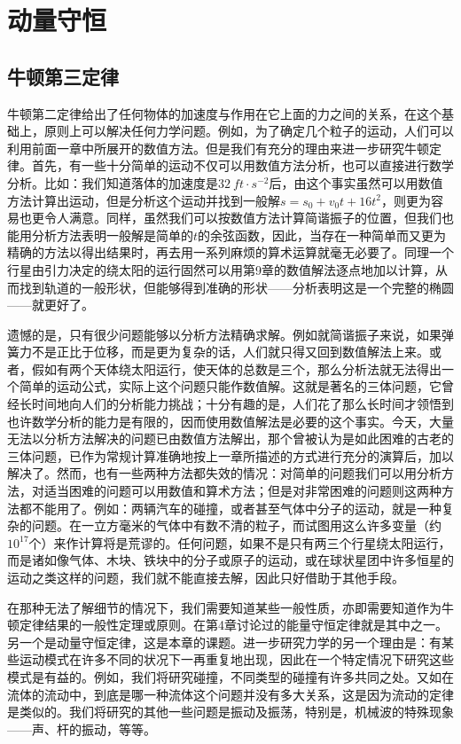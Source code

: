 \chapter{动量守恒}

\section{牛顿第三定律}

牛顿第二定律给出了任何物体的加速度与作用在它上面的力之间的关系，在这个基础上，原则上可以解决任何力学问题。例如，为了确定几个粒子的运动，人们可以利用前面一章中所展开的数值方法。但是我们有充分的理由来进一步研究牛顿定律。首先，有一些十分简单的运动不仅可以用数值方法分析，也可以直接进行数学分析。比如：我们知道落体的加速度是$32~ft \cdot s^{-2}$后，由这个事实虽然可以用数值方法计算出运动，但是分析这个运动并找到一般解$s=s_0+v_0t+16t^2$，则更为容易也更令人满意。同样，虽然我们可以按数值方法计算简谐振子的位置，但我们也能用分析方法表明一般解是简单的$t$的余弦函数，因此，当存在一种简单而又更为精确的方法以得出结果时，再去用一系列麻烦的算术运算就毫无必要了。同理一个行星由引力决定的绕太阳的运行固然可以用第9章的数值解法逐点地加以计算，从而找到轨道的一般形状，但能够得到准确的形状——分析表明这是一个完整的椭圆——就更好了。

遗憾的是，只有很少问题能够以分析方法精确求解。例如就简谐振子来说，如果弹簧力不是正比于位移，而是更为复杂的话，人们就只得又回到数值解法上来。或者，假如有两个天体绕太阳运行，使天体的总数是三个，那么分析法就无法得出一个简单的运动公式，实际上这个问题只能作数值解。这就是著名的三体问题，它曾经长时间地向人们的分析能力挑战；十分有趣的是，人们花了那么长时间才领悟到也许数学分析的能力是有限的，因而使用数值解法是必要的这个事实。今天，大量无法以分析方法解决的问题已由数值方法解出，那个曾被认为是如此困难的古老的三体问题，已作为常规计算准确地按上一章所描述的方式进行充分的演算后，加以解决了。然而，也有一些两种方法都失效的情况：对简单的问题我们可以用分析方法，对适当困难的问题可以用数值和算术方法；但是对非常困难的问题则这两种方法都不能用了。例如：两辆汽车的碰撞，或者甚至气体中分子的运动，就是一种复杂的问题。在一立方毫米的气体中有数不清的粒子，而试图用这么许多变量（约$10^{17}$个）来作计算将是荒谬的。任何问题，如果不是只有两三个行星绕太阳运行，而是诸如像气体、木块、铁块中的分子或原子的运动，或在球状星团中许多恒星的运动之类这样的问题，我们就不能直接去解，因此只好借助于其他手段。

在那种无法了解细节的情况下，我们需要知道某些一般性质，亦即需要知道作为牛顿定律结果的一般性定理或原则。在第4章讨论过的能量守恒定律就是其中之一。另一个是动量守恒定律，这是本章的课题。进一步研究力学的另一个理由是：有某些运动模式在许多不同的状况下一再重复地出现，因此在一个特定情况下研究这些模式是有益的。例如，我们将研究碰撞，不同类型的碰撞有许多共同之处。又如在流体的流动中，到底是哪一种流体这个问题并没有多大关系，这是因为流动的定律是类似的。我们将研究的其他一些问题是振动及振荡，特别是，机械波的特殊现象——声、杆的振动，等等。

